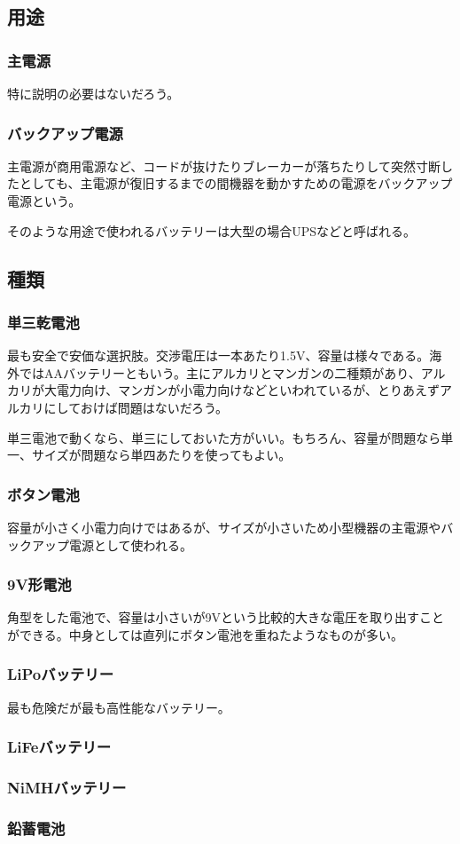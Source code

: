 \documentclass[a4paper,titlepage]{ujarticle}
\begin{document}
\subsection{用途}
\subsubsection{主電源}
特に説明の必要はないだろう。
\subsubsection{バックアップ電源}
主電源が商用電源など、コードが抜けたりブレーカーが落ちたりして突然寸断したとしても、主電源が復旧するまでの間機器を動かすための電源をバックアップ電源という。

そのような用途で使われるバッテリーは大型の場合UPSなどと呼ばれる。
\subsection{種類}
\subsubsection{単三乾電池}
最も安全で安価な選択肢。交渉電圧は一本あたり1.5V、容量は様々である。海外ではAAバッテリーともいう。主にアルカリとマンガンの二種類があり、アルカリが大電力向け、マンガンが小電力向けなどといわれているが、とりあえずアルカリにしておけば問題はないだろう。

単三電池で動くなら、単三にしておいた方がいい。もちろん、容量が問題なら単一、サイズが問題なら単四あたりを使ってもよい。
\subsubsection{ボタン電池}
容量が小さく小電力向けではあるが、サイズが小さいため小型機器の主電源やバックアップ電源として使われる。
\subsubsection{9V形電池}
角型をした電池で、容量は小さいが9Vという比較的大きな電圧を取り出すことができる。中身としては直列にボタン電池を重ねたようなものが多い。
\subsubsection{LiPoバッテリー}
最も危険だが最も高性能なバッテリー。
\subsubsection{LiFeバッテリー}
\subsubsection{NiMHバッテリー}
\subsubsection{鉛蓄電池}
\end{document}
